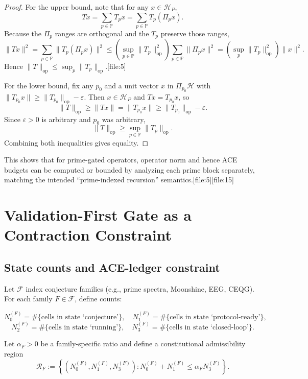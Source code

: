 \documentclass[11pt]{article}
\begin{document}
\begin{proof}
For the upper bound, note that for any \(x\in\mathcal{H}_P\),
\[
Tx = \sum_{p\in\mathbb{P}} T_p x = \sum_{p\in\mathbb{P}} T_p (\Pi_p x).
\]
Because the \(\Pi_p\) ranges are orthogonal and the \(T_p\) preserve those ranges,
\[
\|Tx\|^2 = \sum_{p\in\mathbb{P}} \|T_p(\Pi_p x)\|^2 \le \left(\sup_{p\in\mathbb{P}} \|T_p\|_{\mathrm{op}}^2 \right) \sum_{p\in\mathbb{P}} \|\Pi_p x\|^2
= \left(\sup_p \|T_p\|_{\mathrm{op}}^2\right) \|x\|^2.
\]
Hence \(\|T\|_{\mathrm{op}} \le \sup_p \|T_p\|_{\mathrm{op}}\).[file:5]

For the lower bound, fix any \(p_0\) and a unit vector \(x\) in \(\Pi_{p_0} \mathcal{H}\) with \(\|T_{p_0} x\| \ge \|T_{p_0}\|_{\mathrm{op}} - \varepsilon\).  
Then \(x\in\mathcal{H}_P\) and \(Tx = T_{p_0}x\), so
\[
\|T\|_{\mathrm{op}} \ge \|Tx\| = \|T_{p_0}x\| \ge \|T_{p_0}\|_{\mathrm{op}} - \varepsilon.
\]
Since \(\varepsilon>0\) is arbitrary and \(p_0\) was arbitrary,
\[
\|T\|_{\mathrm{op}} \ge \sup_{p\in\mathbb{P}} \|T_p\|_{\mathrm{op}}.
\]
Combining both inequalities gives equality.
\end{proof}

This shows that for prime-gated operators, operator norm and hence ACE budgets can be computed or bounded by analyzing each prime block separately, matching the intended ``prime-indexed recursion'' semantics.[file:5][file:15]

\section{Validation-First Gate as a Contraction Constraint}

\subsection{State counts and ACE-ledger constraint}

Let \(\mathcal{F}\) index conjecture families (e.g., prime spectra, Moonshine, EEG, CEQG).  
For each family \(F\in\mathcal{F}\), define counts:

\[
N_0^{(F)} = \#\{\text{cells in state `conjecture'}\},\quad
N_1^{(F)} = \#\{\text{cells in state `protocol-ready'}\},
\]
\[
N_2^{(F)} = \#\{\text{cells in state `running'}\},\quad
N_3^{(F)} = \#\{\text{cells in state `closed-loop'}\}.
\]

Let \(\alpha_F>0\) be a family-specific ratio and define a constitutional admissibility region
\[
\mathcal{R}_F := \left\{ (N_0^{(F)},N_1^{(F)},N_3^{(F)}) : N_0^{(F)} + N_1^{(F)} \le \alpha_F N_3^{(F)} \right\}.
\]
\end{document}
